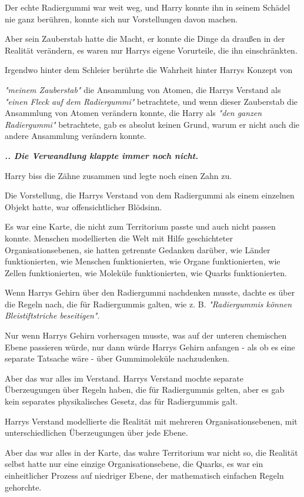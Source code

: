 {Der echte Radiergummi war weit weg, und Harry konnte ihn in seinem Schädel nie ganz berühren, konnte sich nur Vorstellungen davon machen.

Aber sein Zauberstab hatte die Macht, er konnte die Dinge da draußen in der Realität verändern, es waren nur Harrys eigene Vorurteile, die ihn einschränkten.

Irgendwo hinter dem Schleier berührte die Wahrheit hinter Harrys Konzept von

\emph{"meinem Zauberstab"} die Ansammlung von Atomen, die Harrys Verstand als \emph{"einen Fleck auf dem Radiergummi"} betrachtete, und wenn dieser Zauberstab die Ansammlung von Atomen verändern konnte, die Harry als \emph{"den ganzen Radiergummi"} betrachtete, gab es absolut keinen Grund, warum er nicht auch die andere Ansammlung verändern konnte.

\textbf{\emph{.. Die Verwandlung klappte immer noch nicht.}}

Harry biss die Zähne zusammen und legte noch einen Zahn zu.

Die Vorstellung, die Harrys Verstand von dem Radiergummi als einem einzelnen Objekt hatte, war offensichtlicher Blödsinn.

Es war eine Karte, die nicht zum Territorium passte und auch nicht passen konnte. Menschen modellierten die Welt mit Hilfe geschichteter Organisationsebenen, sie hatten getrennte Gedanken darüber, wie Länder funktionierten, wie Menschen funktionierten, wie Organe funktionierten, wie Zellen funktionierten, wie Moleküle funktionierten, wie Quarks funktionierten.

Wenn Harrys Gehirn über den Radiergummi nachdenken musste, dachte es über die Regeln nach, die für Radiergummis galten, wie z. B. \emph{"Radiergummis können Bleistiftstriche beseitigen"}.

Nur wenn Harrys Gehirn vorhersagen musste, was auf der unteren chemischen Ebene passieren würde, nur dann würde Harrys Gehirn anfangen - als ob es eine separate Tatsache wäre - über Gummimoleküle nachzudenken.

Aber das war alles im Verstand. Harrys Verstand mochte separate Überzeugungen über Regeln haben, die für Radiergummis gelten, aber es gab kein separates physikalisches Gesetz, das für Radiergummis galt.

Harrys Verstand modellierte die Realität mit mehreren Organisationsebenen, mit unterschiedlichen Überzeugungen über jede Ebene.

Aber das war alles in der Karte, das wahre Territorium war nicht so, die Realität selbst hatte nur eine einzige Organisationsebene, die Quarks, es war ein einheitlicher Prozess auf niedriger Ebene, der mathematisch einfachen Regeln gehorchte.

}
